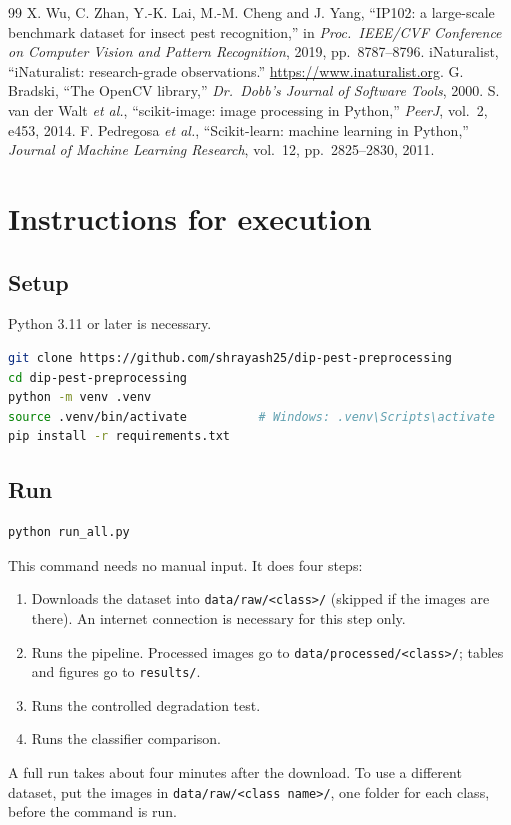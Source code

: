 \documentclass[12pt,a4paper]{article}
\newcommand{\secword}{Section}
\let\oldsection\section
\renewcommand{\section}{\clearpage\oldsection}
\renewcommand{\cftsecpresnum}{Section }
\begin{document}
\begin{thebibliography}{99}
 X. Wu, C. Zhan, Y.-K. Lai, M.-M. Cheng and J. Yang, ``IP102: a large-scale benchmark dataset for insect pest recognition,'' in \textit{Proc.\ IEEE/CVF Conference on Computer Vision and Pattern Recognition}, 2019, pp.~8787--8796.
 iNaturalist, ``iNaturalist: research-grade observations.'' \url{https://www.inaturalist.org}.
 G. Bradski, ``The OpenCV library,'' \textit{Dr.\ Dobb's Journal of Software Tools}, 2000.
 S. van der Walt \textit{et al.}, ``scikit-image: image processing in Python,'' \textit{PeerJ}, vol.~2, e453, 2014.
 F. Pedregosa \textit{et al.}, ``Scikit-learn: machine learning in Python,'' \textit{Journal of Machine Learning Research}, vol.~12, pp.~2825--2830, 2011.
\end{thebibliography}

\appendix
\renewcommand{\secword}{Appendix}
\addtocontents{toc}{\protect\renewcommand{\protect\cftsecpresnum}{Appendix }\protect\setlength{\protect\cftsecnumwidth}{6.4em}}
\section{Instructions for execution}

\subsection{Setup}
Python 3.11 or later is necessary.
\begin{lstlisting}[language=bash,numbers=none]
git clone https://github.com/shrayash25/dip-pest-preprocessing
cd dip-pest-preprocessing
python -m venv .venv
source .venv/bin/activate          # Windows: .venv\Scripts\activate
pip install -r requirements.txt
\end{lstlisting}

\subsection{Run}
\begin{lstlisting}[language=bash,numbers=none]
python run_all.py
\end{lstlisting}
This command needs no manual input. It does four steps:
\begin{enumerate}[nosep]
\item Downloads the dataset into \texttt{data/raw/<class>/} (skipped if the images are there). An internet connection is necessary for this step only.
\item Runs the pipeline. Processed images go to \texttt{data/processed/<class>/}; tables and figures go to \texttt{results/}.
\item Runs the controlled degradation test.
\item Runs the classifier comparison.
\end{enumerate}
A full run takes about four minutes after the download. To use a different dataset, put the images in \texttt{data/raw/<class name>/}, one folder for each class, before the command is run.
\end{document}
